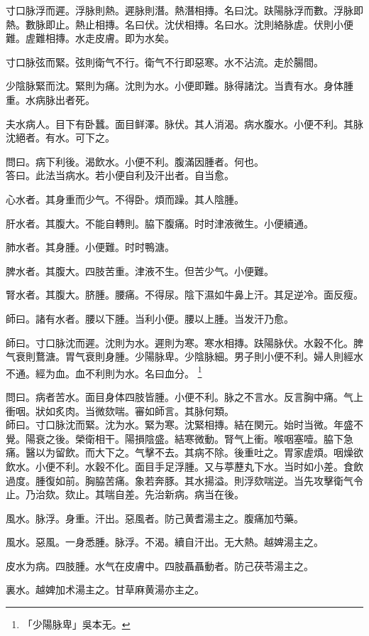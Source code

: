 寸口脉浮而遲。浮脉則熱。遲脉則潛。熱潛相摶。名曰沈。趺陽脉浮而數。浮脉即熱。數脉即止。熱止相摶。名曰伏。沈伏相摶。名曰水。沈則絡脉虗。伏則小便難。虗難相摶。水走皮膚。即为水矣。

寸口脉弦而緊。弦則衛气不行。{\khaaitp 衛气不行}即惡寒。水不沾流。走於腸間。

少陰脉緊而沈。緊則为痛。沈則为水。小便即難。脉得諸沈。当責有水。身体腫重。水病脉出者死。

夫水病人。目下有卧蠶。面目鲜澤。脉伏。其人消渴。病水腹水。小便不利。其脉沈絕者。有水。可下之。

問曰。病下利後。渴飲水。小便不利。腹滿因腫者。何也。\\
答曰。此法当病水。若小便自利及汗出者。自当愈。

心水者。其身重而少气。不得卧。煩而躁。其人陰腫。

肝水者。其腹大。不能自轉則。脇下腹痛。时时津液微生。小便續通。

肺水者。其身腫。小便難。时时鴨溏。

脾水者。其腹大。四肢苦重。津液不生。但苦少气。小便難。

腎水者。其腹大。脐腫。腰痛。不得尿。陰下濕如牛鼻上汗。其足逆冷。面反瘦。

師曰。諸有水者。腰以下腫。当利小便。腰以上腫。当发汗乃愈。

師曰。寸口脉沈而遲。沈則为水。遲則为寒。寒水相摶。趺陽脉伏。水穀不化。脾气衰則鶩溏。胃气衰則身腫。{\khaaitp 少陽脉卑。}少陰脉細。男子則小便不利。婦人則經水不通。經为血。血不利則为水。名曰血分。
	\footnote{
		「少陽脉卑」吳本无。
	}

問曰。病者苦水。面目身体四肢皆腫。小便不利。脉之不言水。反言胸中痛。气上衝咽。狀如炙肉。当微欬喘。審如師言。其脉何類。\\
師曰。寸口脉沈而緊。沈为水。緊为寒。沈緊相摶。結在関元。始时当微。年盛不覺。陽衰之後。榮衛相干。陽損陰盛。結寒微動。腎气上衝。喉咽塞噎。脇下急痛。醫以为留飲。而大下之。气擊不去。其病不除。後重吐之。胃家虗煩。咽燥欲飲水。小便不利。水穀不化。面目手足浮腫。又与葶藶丸下水。当时如小差。食飲過度。腫復如前。胸脇苦痛。象若奔豚。其水揚溢。則浮欬喘逆。当先攻擊衛气令止。乃治欬。欬止。其喘自差。先治新病。病当在後。

風水。脉浮。身重。汗出。惡風者。防己黄耆湯主之。腹痛加芍藥。

風水。惡風。一身悉腫。脉浮。不渴。續自汗出。无大熱。越婢湯主之。

皮水为病。四肢腫。水气在皮膚中。四肢聶聶動者。防己茯苓湯主之。

裏水。越婢加术湯主之。甘草麻黄湯亦主之。

